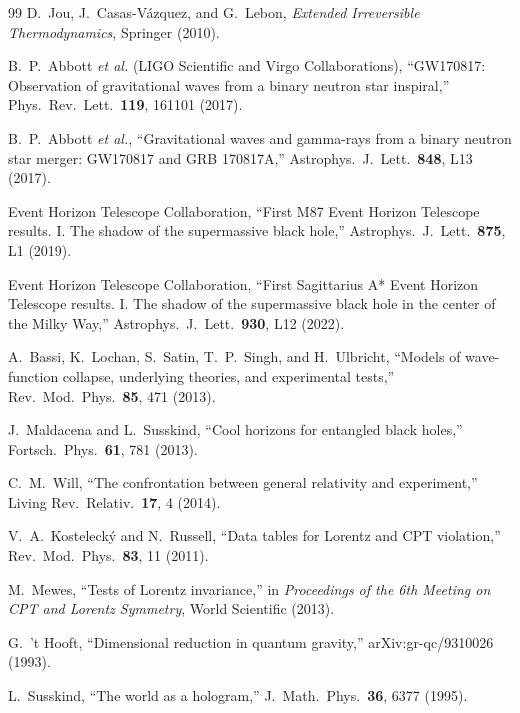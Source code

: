 \documentclass[aps,prd,twocolumn,showpacs,superscriptaddress,preprintnumbers]{revtex4-2}
\begin{document}
\begin{thebibliography}{99}
D.~Jou, J.~Casas-V{\'a}zquez, and G.~Lebon,
\textit{Extended Irreversible Thermodynamics},
Springer (2010).

B.~P.~Abbott \textit{et al.} (LIGO Scientific and Virgo Collaborations),
``GW170817: Observation of gravitational waves from a binary neutron star inspiral,''
Phys.\ Rev.\ Lett.\ \textbf{119}, 161101 (2017).

B.~P.~Abbott \textit{et al.},
``Gravitational waves and gamma-rays from a binary neutron star merger: GW170817 and GRB 170817A,''
Astrophys.\ J.\ Lett.\ \textbf{848}, L13 (2017).

Event Horizon Telescope Collaboration,
``First M87 Event Horizon Telescope results. I. The shadow of the supermassive black hole,''
Astrophys.\ J.\ Lett.\ \textbf{875}, L1 (2019).

Event Horizon Telescope Collaboration,
``First Sagittarius A* Event Horizon Telescope results. I. The shadow of the supermassive black hole in the center of the Milky Way,''
Astrophys.\ J.\ Lett.\ \textbf{930}, L12 (2022).

A.~Bassi, K.~Lochan, S.~Satin, T.~P.~Singh, and H.~Ulbricht,
``Models of wave-function collapse, underlying theories, and experimental tests,''
Rev.\ Mod.\ Phys.\ \textbf{85}, 471 (2013).

J.~Maldacena and L.~Susskind,
``Cool horizons for entangled black holes,''
Fortsch.\ Phys.\ \textbf{61}, 781 (2013).

C.~M.~Will,
``The confrontation between general relativity and experiment,''
Living Rev.\ Relativ.\ \textbf{17}, 4 (2014).

V.~A.~Kosteleck{\'y} and N.~Russell,
``Data tables for Lorentz and CPT violation,''
Rev.\ Mod.\ Phys.\ \textbf{83}, 11 (2011).

M.~Mewes,
``Tests of Lorentz invariance,''
in \textit{Proceedings of the 6th Meeting on CPT and Lorentz Symmetry},
World Scientific (2013).

G.~'t Hooft,
``Dimensional reduction in quantum gravity,''
arXiv:gr-qc/9310026 (1993).

L.~Susskind,
``The world as a hologram,''
J.\ Math.\ Phys.\ \textbf{36}, 6377 (1995).

\end{thebibliography}
\end{document}
